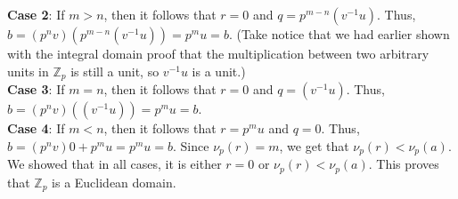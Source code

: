 \documentclass{article}
\begin{document}
\begin{enumerate}
\begin{enumerate}
    \textbf{Case 2}: If $m > n$, then it follows that $r = 0$ and $q = p^{m-n}(v^{-1}u)$. Thus, $b = (p^n v)(p^{m-n}(v^{-1}u)) = p^m u = b$. (Take notice that we had earlier shown with the integral domain proof that the multiplication between two arbitrary units in $\mathbb{Z}_p$ is still a unit, so $v^{-1}u$ is a unit.) \\

    \textbf{Case 3}: If $m = n$, then it follows that $r = 0$ and $q = (v^{-1}u)$. Thus, $b = (p^n v)((v^{-1}u)) = p^m u = b$. \\

    \textbf{Case 4}: If $m < n$, then it follows that $r = p^m u$ and $q = 0$. Thus, $b = (p^n v)0 + p^m u = p^m u = b$. Since $\nu_p(r) = m$, we get that $\nu_p(r) < \nu_p(a)$. \\

    We showed that in all cases, it is either $r = 0$ or $\nu_p(r) < \nu_p(a)$. This proves that $\mathbb{Z}_p$ is a Euclidean domain.


\end{enumerate}

\end{enumerate}
\end{document}

